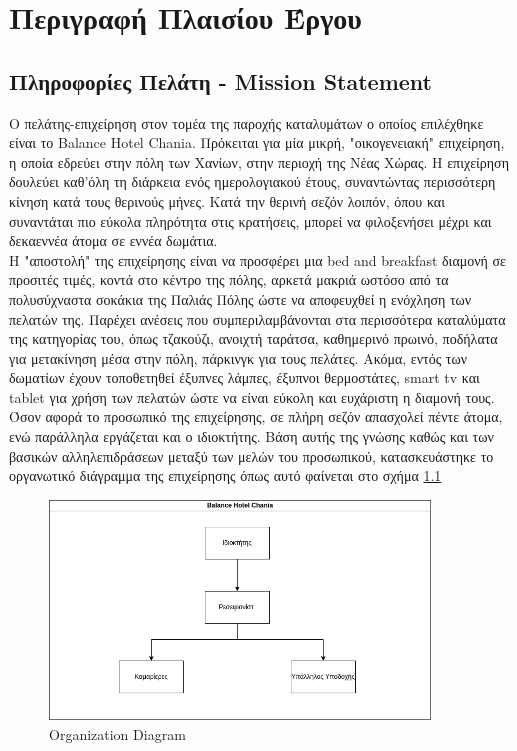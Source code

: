 \chapter{Περιγραφή Πλαισίου Έργου}
\section{Πληροφορίες Πελάτη - Mission Statement}
Ο πελάτης-επιχείρηση στον τομέα της παροχής καταλυμάτων ο οποίος επιλέχθηκε είναι το Balance Hotel
Chania. Πρόκειται για μία μικρή, "οικογενειακή" επιχείρηση, η οποία εδρεύει στην πόλη των Χανίων, στην
περιοχή της Νέας Χώρας. Η επιχείρηση δουλεύει καθ'όλη τη διάρκεια ενός ημερολογιακού έτους, 
συναντώντας περισσότερη κίνηση κατά τους θερινούς μήνες. Κατά την θερινή σεζόν λοιπόν, όπου και
συναντάται πιο εύκολα πληρότητα στις κρατήσεις, μπορεί να φιλοξενήσει μέχρι και δεκαεννέα άτομα σε 
εννέα δωμάτια.\\ 

\noindent
Η "αποστολή" της επιχείρησης είναι  να προσφέρει μια bed and breakfast διαμονή σε προσιτές τιμές, 
κοντά στο κέντρο της πόλης, αρκετά μακριά ωστόσο από τα πολυσύχναστα σοκάκια της Παλιάς Πόλης 
ώστε να αποφευχθεί η ενόχληση των πελατών της. Παρέχει ανέσεις που συμπεριλαμβάνονται στα 
περισσότερα καταλύματα της κατηγορίας του, όπως τζακούζι, ανοιχτή ταράτσα, καθημερινό πρωινό, 
ποδήλατα για μετακίνηση μέσα στην πόλη, πάρκινγκ για τους πελάτες. Ακόμα, εντός των δωματίων 
έχουν τοποθετηθεί έξυπνες λάμπες, έξυπνοι θερμοστάτες, smart tv και tablet για χρήση των πελατών
ώστε να είναι εύκολη και ευχάριστη η διαμονή τους. \\

\noindent
Όσον αφορά το προσωπικό της επιχείρησης, σε πλήρη σεζόν απασχολεί πέντε άτομα, ενώ παράλληλα 
εργάζεται και ο ιδιοκτήτης. Βάση αυτής της γνώσης καθώς και των βασικών αλληλεπιδράσεων μεταξύ 
των μελών του προσωπικού, κατασκευάστηκε το οργανωτικό διάγραμμα της επιχείρησης όπως αυτό φαίνεται στο σχήμα \ref{organ_diag} 
\begin{figure}[H]
	\centering
	 \includegraphics[width=0.9\textwidth]{Images/organization_diagram_2.1}
	 \caption{Organization Diagram}
	\label{organ_diag}
\end{figure}


